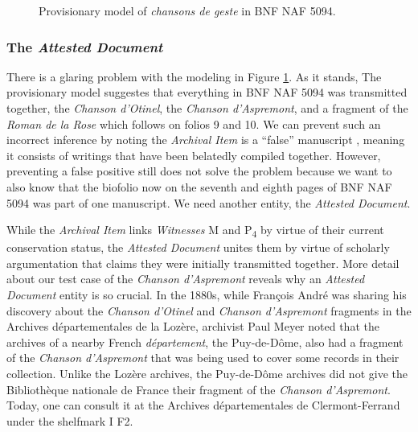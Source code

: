 \begin{figure}[ht]
    \begin{center}
        
    \end{center}
    \caption{Provisionary model of \textit{chansons de geste} in BNF NAF 5094.}
    \label{fig:BNFNAF5094}
\end{figure}

\subsubsection{The \textit{Attested Document}}

There is a glaring problem with the modeling in Figure \ref{fig:BNFNAF5094}. As it stands, The provisionary model suggestes that everything in BNF NAF 5094 was transmitted together, the \textit{Chanson d'Otinel}, the \textit{Chanson d'Aspremont}, and a fragment of the \textit{Roman de la Rose} which follows on folios 9 and 10.  We can prevent such an incorrect inference by noting the \textit{Archival Item} is a ``false'' manuscript , meaning it consists of writings that have been belatedly compiled together. However, preventing a false positive still does not solve the problem because we want to also know that the biofolio now on the seventh and eighth pages of BNF NAF 5094 was part of one manuscript. We need another entity, the \textit{Attested Document}.

While the \textit{Archival Item} links \textit{Witnesses} M and P\textsubscript{4} by virtue of their current conservation status, the \textit{Attested Document} unites them by virtue of scholarly argumentation that claims they were initially transmitted together. More detail about our test case of the \textit{Chanson d'Aspremont} reveals why an \textit{Attested Document} entity is so crucial. In the 1880s, while François André was sharing his discovery about the \textit{Chanson d'Otinel} and \textit{Chanson d'Aspremont} fragments in the Archives départementales de la Lozère, archivist Paul Meyer noted that the archives of a nearby French \textit{département}, the Puy-de-Dôme, also had a fragment of the \textit{Chanson d'Aspremont} that was being used to cover some records in their collection. Unlike the Lozère archives, the Puy-de-Dôme archives did not give the Bibliothèque nationale de France their fragment of the \textit{Chanson d'Aspremont}. Today, one can consult it at the Archives départementales de Clermont-Ferrand under the shelfmark I F2.

